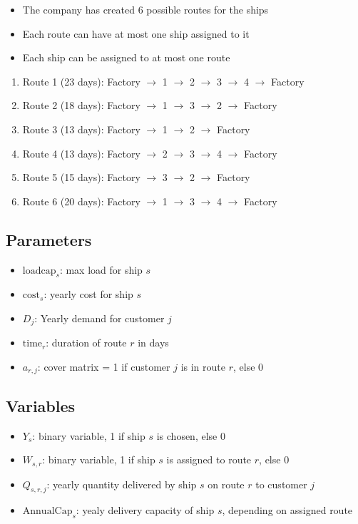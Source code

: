 \documentclass[10pt]{article}
\begin{document}
\begin{itemize}
    \item The company has created 6 possible routes for the ships 
    \item Each route can have at most one ship assigned to it 
    \item Each ship can be assigned to at most one route 
\end{itemize}
\begin{enumerate}
    \item Route 1 (23 days): Factory $\to $ 1 $\to $ 2 $\to $ 3 $\to $ 4 $\to $ Factory
    \item Route 2 (18 days): Factory $\to $ 1 $\to $ 3 $\to $ 2 $\to $ Factory
    \item Route 3 (13 days): Factory $\to $ 1 $\to $ 2 $\to $ Factory
    \item Route 4 (13 days): Factory $\to $ 2 $\to $ 3 $\to $ 4 $\to $ Factory
    \item Route 5 (15 days): Factory $\to $ 3 $\to $ 2 $\to $ Factory
    \item Route 6 (20 days): Factory $\to $ 1 $\to $ 3 $\to $ 4 $\to $ Factory
\end{enumerate}
\newpage 
\subsection{Parameters}
\begin{itemize}
    \item $\text{loadcap}_s $: max load for ship $s $
    \item $\text{cost}_s $: yearly cost for ship $s $
    \item $D_j $: Yearly demand for customer $j $
    \item $\text{time}_r $: duration of route $r $ in days 
    \item $a_{r, j} $: cover matrix = 1 if customer $j $ is in route $r $, else 0
\end{itemize}
\subsection{Variables}
\begin{itemize}
    \item $Y_s $: binary variable, 1 if ship $s $ is chosen, else 0
    \item $W_{s, r} $: binary variable, 1 if ship $s $ is assigned to route $ r $, else 0 
    \item $Q_{s, r, j} $: yearly quantity delivered by ship $s $ on route $ r $ to customer $j $
    \item $\text{AnnualCap}_s $: yealy delivery capacity of ship $s $, depending on assigned route 
\end{itemize}
\end{document}
